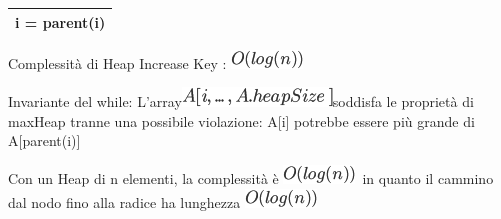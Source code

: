 \documentclass{article}
\begin{document}
\begin{longtable}[]{@{}l@{}}
\begin{minipage}[t]{0.97\columnwidth}
{\hspace*{0.333em}\hspace*{0.333em}\hspace*{0.333em}\hspace*{0.333em}\hspace*{0.333em}\hspace*{0.333em}\hspace*{0.333em}\hspace*{0.333em}\hspace*{0.333em}\hspace*{0.333em}\hspace*{0.333em}\hspace*{0.333em}\hspace*{0.333em}\hspace*{0.333em}\hspace*{0.333em}\hspace*{0.333em}\hspace*{0.333em}\hspace*{0.333em}\hspace*{0.333em}\hspace*{0.333em}\hspace*{0.333em}\hspace*{0.333em}\hspace*{0.333em}\hspace*{0.333em}i
= }{parent}{(i)}\strut
\end{minipage}\tabularnewline
\bottomrule
\end{longtable}

{Complessità di Heap Increase Key :
}\includegraphics{images/image144.png}

{}

{Invariante del while:
L'array}\includegraphics{images/image145.png}{soddisfa le proprietà di
maxHeap tranne una possibile violazione: A{[}i{]} potrebbe essere più
grande di A{[}parent(i){]}}

{}

{Con un Heap di n elementi, la complessità è
}\includegraphics{images/image144.png}{~in quanto il cammino dal nodo
fino alla radice ha lunghezza }\includegraphics{images/image144.png}
\end{document}
